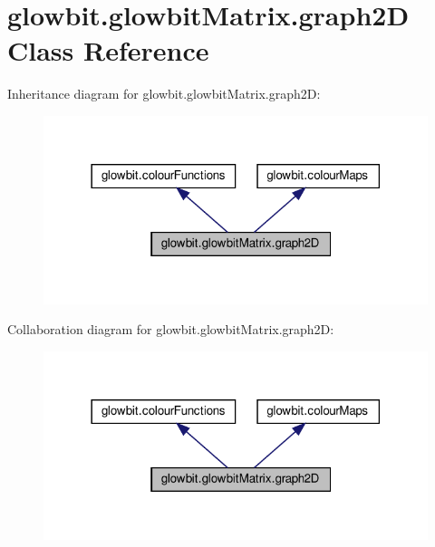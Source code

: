 \hypertarget{classglowbit_1_1glowbitMatrix_1_1graph2D}{}\section{glowbit.\+glowbit\+Matrix.\+graph2D Class Reference}
\label{classglowbit_1_1glowbitMatrix_1_1graph2D}


Inheritance diagram for glowbit.\+glowbit\+Matrix.\+graph2D\+:\nopagebreak
\begin{figure}[H]
\begin{center}
\leavevmode
\includegraphics[width=318pt]{classglowbit_1_1glowbitMatrix_1_1graph2D__inherit__graph}
\end{center}
\end{figure}


Collaboration diagram for glowbit.\+glowbit\+Matrix.\+graph2D\+:\nopagebreak
\begin{figure}[H]
\begin{center}
\leavevmode
\includegraphics[width=318pt]{classglowbit_1_1glowbitMatrix_1_1graph2D__coll__graph}
\end{center}
\end{figure}
